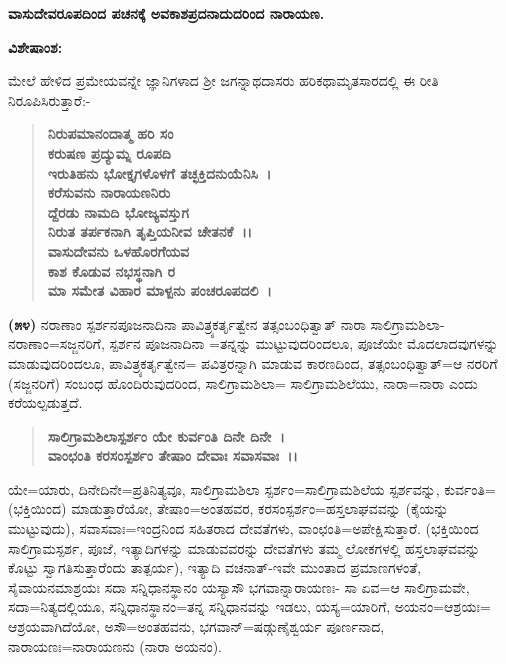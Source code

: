 \begin{center}
\textbf{ವಾಸುದೇವರೂಪದಿಂದ ಪಚನಕ್ಕೆ ಅವಕಾಶಪ್ರದನಾದುದರಿಂದ ನಾರಾಯಣ.}
\end{center}

\noindent
\textbf{ವಿಶೇಷಾಂಶ:\enginline{-}}

ಮೇಲೆ ಹೇಳಿದ ಪ್ರಮೇಯವನ್ನೇ ಜ್ಞಾನಿಗಳಾದ ಶ‍್ರೀ ಜಗನ್ನಾಥದಾಸರು ಹರಿಕಥಾಮೃತಸಾರದಲ್ಲಿ ಈ ರೀತಿ ನಿರೂಪಿಸಿರುತ್ತಾರೆ:-

\begin{verse}
\textbf{ನಿರುಪಮಾನಂದಾತ್ಮ ಹರಿ ಸಂ}\\\textbf{ಕರುಷಣ ಪ್ರದ್ಯುಮ್ನ ರೂಪದಿ}\\\textbf{ಇರುತಿಹನು ಭೋಕ್ತೃಗಳೊಳಗೆ ತಚ್ಛಕ್ತಿದನುಯೆನಿಸಿ~।}\\\textbf{ಕರೆಸುವನು ನಾರಾಯಣನಿರು}\\\textbf{ದ್ದೆರಡು ನಾಮದಿ ಭೋಜ್ಯವಸ್ತುಗ}\\\textbf{ನಿರುತ ತರ್ಪಕನಾಗಿ ತೃಪ್ತಿಯನೀವ ಚೇತನಕೆ~।।}\\\textbf{ವಾಸುದೇವನು ಒಳಹೊರಗೆಯವ}\\\textbf{ಕಾಶ ಕೊಡುವ ನಭಸ್ಥನಾಗಿ ರ\enginline{-}}\\\textbf{ಮಾ ಸಮೇತ ವಿಹಾರ ಮಾಳ್ಪನು ಪಂಚರೂಪದಲಿ~।}
\end{verse}

\textbf{(೫೪)} ನರಾಣಾಂ ಸ್ಪರ್ಶನಪೂಜನಾದಿನಾ ಪಾವಿತ್ರ್ಯಕರ್ತೃತ್ವೇನ ತತ್ಸಂಬಂಧಿತ್ವಾತ್ ನಾರಾ ಸಾಲಿಗ್ರಾಮಶಿಲಾ-ನರಾಣಾಂ=ಸಜ್ಜನರಿಗೆ, ಸ್ಪರ್ಶನ ಪೂಜನಾದಿನಾ =ತನ್ನನ್ನು ಮುಟ್ಟುವುದರಿಂದಲೂ, ಪೂಜೆಯೇ ಮೊದಲಾದವುಗಳನ್ನು ಮಾಡುವುದರಿಂದಲೂ, ಪಾವಿತ್ರ್ಯಕರ್ತೃತ್ವೇನ= ಪವಿತ್ರರನ್ನಾಗಿ ಮಾಡುವ ಕಾರಣದಿಂದ, ತತ್ಸಂಬಂಧಿತ್ವಾತ್=ಆ ನರರಿಗೆ (ಸಜ್ಜನರಿಗೆ) ಸಂಬಂಧ ಹೊಂದಿರುವುದರಿಂದ, ಸಾಲಿಗ್ರಾಮಶಿಲಾ= ಸಾಲಿಗ್ರಾಮಶಿಲೆಯು, ನಾರಾ=ನಾರಾ ಎಂದು ಕರೆಯಲ್ಪಡುತ್ತದೆ.

\begin{verse}
\textbf{ಸಾಲಿಗ್ರಾಮಶಿಲಾಸ್ಪರ್ಶಂ ಯೇ ಕುರ್ವಂತಿ ದಿನೇ ದಿನೇ~।} \\\textbf{ವಾಂಛಂತಿ ಕರಸಂಸ್ಪರ್ಶಂ ತೇಷಾಂ ದೇವಾಃ ಸವಾಸವಾಃ~।।}
\end{verse}

ಯೇ=ಯಾರು, ದಿನೇದಿನೇ=ಪ್ರತಿನಿತ್ಯವೂ, ಸಾಲಿಗ್ರಾಮಶಿಲಾ ಸ್ಪರ್ಶಂ=ಸಾಲಿಗ್ರಾಮ\-ಶಿಲೆಯ ಸ್ಪರ್ಶವನ್ನು, ಕುರ್ವಂತಿ=(ಭಕ್ತಿಯಿಂದ) ಮಾಡುತ್ತಾರೆಯೋ, ತೇಷಾಂ=ಅಂತಹವರ, ಕರಸಂಸ್ಪರ್ಶಂ=ಹಸ್ತಲಾಘವವನ್ನು (ಕೈಯನ್ನು ಮುಟ್ಟುವುದು), ಸವಾಸವಾಃ=ಇಂದ್ರನಿಂದ ಸಹಿತರಾದ ದೇವತೆಗಳು, ವಾಂಛಂತಿ=ಅಪೇಕ್ಷಿಸುತ್ತಾರೆ. (ಭಕ್ತಿಯಿಂದ ಸಾಲಿಗ್ರಾಮಸ್ಪರ್ಶ, ಪೂಜೆ, ಇತ್ಯಾದಿಗಳನ್ನು ಮಾಡುವವರನ್ನು ದೇವತೆಗಳು ತಮ್ಮ ಲೋಕಗಳಲ್ಲಿ ಹಸ್ತಲಾಘವವನ್ನು ಕೊಟ್ಟು ಸ್ವಾಗತಿಸುತ್ತಾರೆಂದು ತಾತ್ಪರ್ಯ), ಇತ್ಯಾದಿ ವಚನಾತ್-ಇವೇ ಮುಂತಾದ ಪ್ರಮಾಣಗಳಂತೆ, ಸೈವಾಯನಮಾಶ್ರಯಃ ಸದಾ ಸನ್ನಿಧಾನಸ್ಥಾನಂ ಯಸ್ಯಾಸೌ ಭಗವಾನ್ನಾರಾಯಣಃ- ಸಾ ಏವ=ಆ ಸಾಲಿಗ್ರಾಮವೇ, ಸದಾ=ನಿತ್ಯದಲ್ಲಿಯೂ, ಸನ್ನಿಧಾನಸ್ಥಾನಂ=ತನ್ನ ಸನ್ನಿಧಾನವನ್ನು ಇಡಲು, ಯಸ್ಯ=ಯಾರಿಗೆ, ಅಯನಂ=ಆಶ್ರಯಃ= ಆಶ್ರಯವಾಗಿದೆಯೋ, ಅಸೌ=ಅಂತಹವನು, ಭಗವಾನ್=ಷಡ್ಗುಣೈಶ್ವರ್ಯ ಪೂರ್ಣನಾದ, ನಾರಾಯಣಃ=ನಾರಾ\-ಯಣನು (ನಾರಾ ಅಯನಂ).

